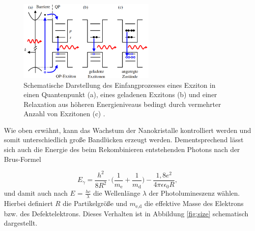 \begin{figure}[hbtp]
	\centering
	\includegraphics[width=0.6\textwidth]{Abb/photoqp.png}
	\caption{Schematische Darstellung des Einfangprozesses eines Exziton in einen
	Quantenpunkt (a), eines geladenen Exzitons (b) und einer Relaxation
	aus höheren Energieniveaus bedingt durch vermehrter Anzahl von Exzitonen (c) \cite{lars}.}
	\label{fig:photoqp}
\end{figure}
\noindent
Wie oben erwähnt, kann das Wachstum der Nanokristalle kontrolliert werden und
somit unterschiedlich große Bandlücken erzeugt werden. Dementsprechend lässt
sich auch die Energie des beim Rekombinieren entstehenden Photons nach der Brus-Formel

\begin{equation}
	E_{\gamma} = \frac{h^2}{8R^2}\cdot \biggl(\frac{1}{m_{\text{e}}} + \frac{1}{m_{\text{d}}} \biggr)
								- \frac{1,8e^2}{4\pi\epsilon\epsilon_0 R},
	\label{F1}
\end{equation}
\noindent
und damit auch nach $E$ = $\frac{hc}{\lambda}$ die Wellenlänge $\lambda$ der
Photolumineszenz wählen. Hierbei definiert $R$ die Partikelgröße und
$m_{\text{e,d}}$ die effektive Masse des Elektrons bzw. des Defektelektrons.
Dieses Verhalten ist in Abbildung \ref{fig:size} schematisch dargestellt.

